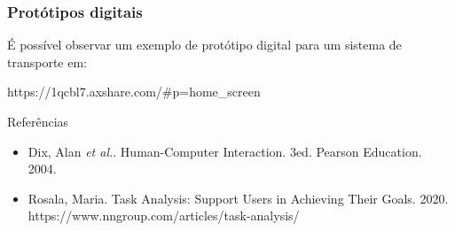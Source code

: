 \documentclass[11pt]{beamer}
\begin{document}
    \begin{frame}
      \frametitle{Protótipos digitais}
      É possível observar um exemplo de protótipo digital para um sistema de transporte em:

      https://1qcbl7.axshare.com/\#p=home\_screen
    \end{frame}

    \begin{frame}{Referências}
      \begin{itemize}
        \item Dix, Alan \textit{et al.}. Human-Computer Interaction. 3ed. Pearson Education. 2004.
        \item Rosala, Maria. Task Analysis: Support Users in Achieving Their Goals. 2020. https://www.nngroup.com/articles/task-analysis/
      \end{itemize}
    \end{frame}
\end{document}

